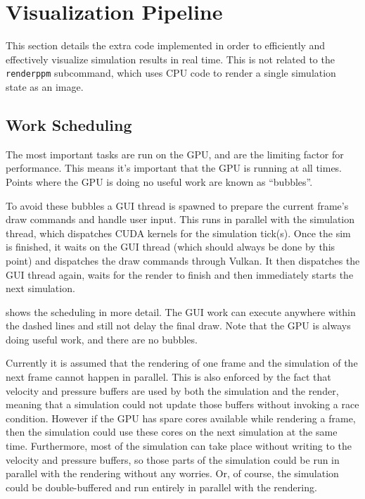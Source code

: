 \section{Visualization Pipeline}
This section details the extra code implemented in order to efficiently and effectively visualize simulation results in real time.
This is not related to the \texttt{renderppm} subcommand, which uses CPU code to render a single simulation state as an image.

\subsection{Work Scheduling}
The most important tasks are run on the GPU, and are the limiting factor for performance.
This means it's important that the GPU is running at all times.
Points where the GPU is doing no useful work are known as ``bubbles''.

To avoid these bubbles a GUI thread is spawned to prepare the current frame's draw commands and handle user input.
This runs in parallel with the simulation thread, which dispatches CUDA kernels for the simulation tick(s).
Once the sim is finished, it waits on the GUI thread (which should always be done by this point) and dispatches the draw commands through Vulkan.
It then dispatches the GUI thread again, waits for the render to finish and then immediately starts the next simulation.

 shows the scheduling in more detail.
The GUI work can execute anywhere within the dashed lines and still not delay the final draw.
Note that the GPU is always doing useful work, and there are no bubbles.



Currently it is assumed that the rendering of one frame and the simulation of the next frame cannot happen in parallel.
\label{sec:DesignBetterScheduling}
This is also enforced by the fact that velocity and pressure buffers are used by both the simulation and the render, meaning that a simulation could not update those buffers without invoking a race condition.
However if the GPU has spare cores available while rendering a frame, then the simulation could use these cores on the next simulation at the same time.
Furthermore, most of the simulation can take place without writing to the velocity and pressure buffers, so those parts of the simulation could be run in parallel with the rendering without any worries.
Or, of course, the simulation could be double-buffered and run entirely in parallel with the rendering.

